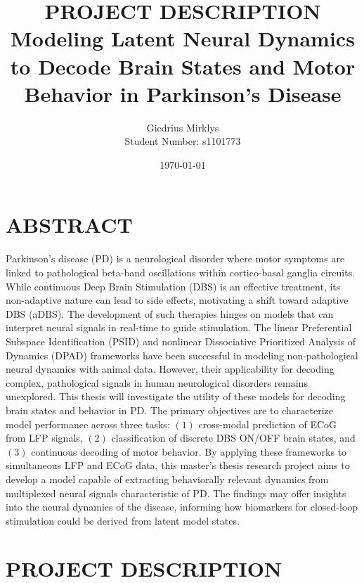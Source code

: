 \documentclass[12pt, a4paper]{article}
\begin{document}
\title{\textbf{PROJECT DESCRIPTION} \\ \vspace{1.5em} \large Modeling Latent Neural Dynamics to Decode Brain States and Motor Behavior in Parkinson’s Disease}
\author{Giedrius Mirklys \\
    \normalsize{Student Number: s1101773}}
\date{\today} %

\maketitle
\RaggedRight


\section{ABSTRACT}
Parkinson’s disease (PD) is a neurological disorder where motor symptoms are linked to pathological beta-band oscillations within cortico-basal ganglia circuits. While continuous Deep Brain Stimulation (DBS) is an effective treatment, its non-adaptive nature can lead to side effects, motivating a shift toward adaptive DBS (aDBS). The development of such therapies hinges on models that can interpret neural signals in real-time to guide stimulation. The linear Preferential Subspace Identification (PSID) and nonlinear Dissociative Prioritized Analysis of Dynamics (DPAD) frameworks have been successful in modeling non-pathological neural dynamics with animal data. However, their applicability for decoding complex, pathological signals in human neurological disorders remains unexplored. This thesis will investigate the utility of these models for decoding brain states and behavior in PD. The primary objectives are to characterize model performance across three tasks: $(1)$ cross-modal prediction of ECoG from LFP signals, $(2)$ classification of discrete DBS ON/OFF brain states, and $(3)$ continuous decoding of motor behavior. By applying these frameworks to simultaneous LFP and ECoG data, this master's thesis research project aims to develop a model capable of extracting behaviorally relevant dynamics from multiplexed neural signals characteristic of PD. The findings may offer insights into the neural dynamics of the disease, informing how biomarkers for closed-loop stimulation could be derived from latent model states.

\section{PROJECT DESCRIPTION}
\end{document}
